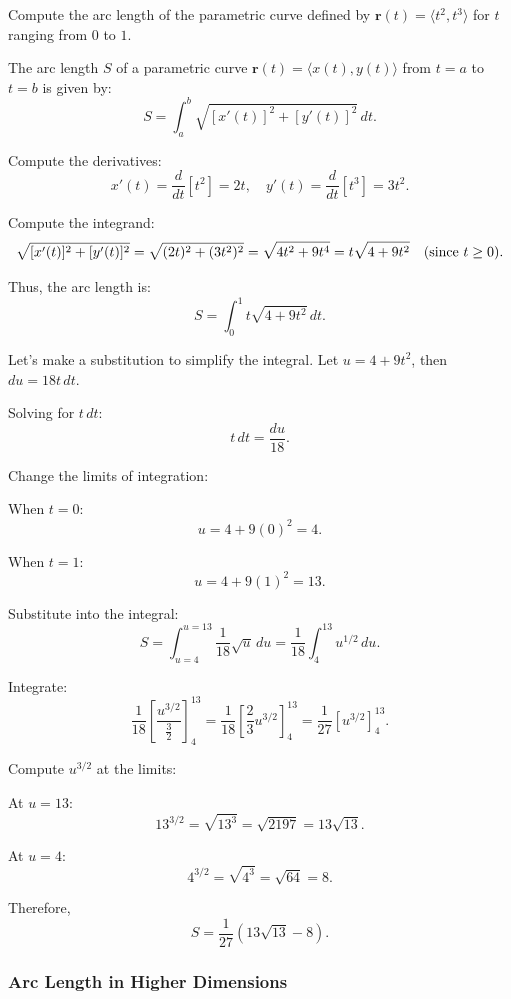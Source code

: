 \begin{example}
Compute the arc length of the parametric curve defined by \( \mathbf{r}(t) = \langle t^2, t^3 \rangle \) for \( t \) ranging from \( 0 \) to \( 1 \).

\begin{solution}
The arc length \( S \) of a parametric curve \( \mathbf{r}(t) = \langle x(t), y(t) \rangle \) from \( t = a \) to \( t = b \) is given by:
\[
S = \int_{a}^{b} \sqrt{ [x'(t)]^2 + [y'(t)]^2 } \, dt.
\]

Compute the derivatives:
\[
x'(t) = \frac{d}{dt} [t^2] = 2t, \quad y'(t) = \frac{d}{dt} [t^3] = 3t^2.
\]

Compute the integrand:
\[
\sqrt{ [x'(t)]^2 + [y'(t)]^2 } = \sqrt{ (2t)^2 + (3t^2)^2 } = \sqrt{ 4t^2 + 9t^4 } = t \sqrt{ 4 + 9t^2 } \quad \text{(since \( t \geq 0 \))}.
\]

Thus, the arc length is:
\[
S = \int_{0}^{1} t \sqrt{ 4 + 9t^2 } \, dt.
\]

Let’s make a substitution to simplify the integral. Let \( u = 4 + 9t^2 \), then \( du = 18t \, dt \).

Solving for \( t \, dt \):
\[
t \, dt = \frac{du}{18}.
\]

Change the limits of integration:

When \( t = 0 \):
\[
u = 4 + 9(0)^2 = 4.
\]

When \( t = 1 \):
\[
u = 4 + 9(1)^2 = 13.
\]

Substitute into the integral:
\[
S = \int_{u = 4}^{u = 13} \frac{1}{18} \sqrt{u} \, du = \frac{1}{18} \int_{4}^{13} u^{1/2} \, du.
\]

Integrate:
\[
\frac{1}{18} \left[ \frac{u^{3/2}}{\tfrac{3}{2}} \right]_{4}^{13} = \frac{1}{18} \left[ \frac{2}{3} u^{3/2} \right]_{4}^{13} = \frac{1}{27} \left[ u^{3/2} \right]_{4}^{13}.
\]

Compute \( u^{3/2} \) at the limits:

At \( u = 13 \):
\[
13^{3/2} = \sqrt{13^3} = \sqrt{2197} = 13 \sqrt{13}.
\]

At \( u = 4 \):
\[
4^{3/2} = \sqrt{4^3} = \sqrt{64} = 8.
\]

Therefore,
\[
S = \frac{1}{27} \left( 13 \sqrt{13} - 8 \right).
\]

\end{solution}
\end{example}
\exampleline



\subsubsection*{Arc Length in Higher Dimensions} 


